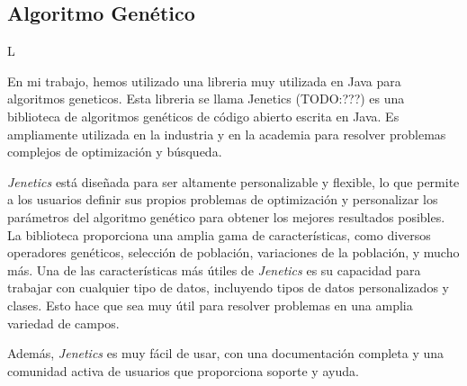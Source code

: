 


\subsection{Algoritmo Genético}
\label{alg:approachGA}
L


En mi trabajo, hemos utilizado una libreria muy utilizada en Java para algoritmos geneticos. Esta libreria se llama Jenetics (TODO:???) es una biblioteca de algoritmos genéticos de código abierto escrita en Java. Es ampliamente utilizada en la industria y en la academia para resolver problemas complejos de optimización y búsqueda.


\emph{Jenetics} está diseñada para ser altamente personalizable y flexible, lo que permite a los usuarios definir sus propios problemas de optimización y personalizar los parámetros del algoritmo genético para obtener los mejores resultados posibles. La biblioteca proporciona una amplia gama de características, como diversos operadores genéticos, selección de población, variaciones de la población, y mucho más.
Una de las características más útiles de \emph{Jenetics} es su capacidad para trabajar con cualquier tipo de datos, incluyendo tipos de datos personalizados y clases. Esto hace que sea muy útil para resolver problemas en una amplia variedad de campos.

Además, \emph{Jenetics} es muy fácil de usar, con una documentación completa y una comunidad activa de usuarios que proporciona soporte y ayuda. 

